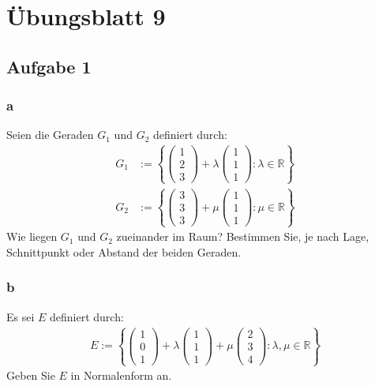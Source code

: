 \chapter{Übungsblatt 9}

\section{Aufgabe 1}

\subsection{a}
Seien die Geraden $G_1$ und $G_2$ definiert durch:
\begin{align*}
G_1 &:= \left\{\begin{pmatrix}
1 \\ 2 \\ 3
\end{pmatrix} + \lambda\begin{pmatrix}
1 \\ 1 \\ 1
\end{pmatrix}: \lambda \in \mathbb{R}\right\} \\
G_2 &:= \left\{\begin{pmatrix}
3 \\ 3 \\ 3
\end{pmatrix} + \mu \begin{pmatrix}
1 \\ 1 \\ 1
\end{pmatrix}: \mu \in \mathbb{R}\right\}
\end{align*}
Wie liegen $G_1$ und $G_2$ zueinander im Raum? Bestimmen Sie, je nach Lage, Schnittpunkt oder Abstand der beiden Geraden.

\subsection{b}

Es sei $E$ definiert durch:
\begin{align*}
    E := \left\{\begin{pmatrix}
    1 \\ 0 \\1
    \end{pmatrix} + \lambda \begin{pmatrix}
        1 \\ 1 \\ 1
    \end{pmatrix} + \mu \begin{pmatrix}
        2 \\ 3 \\ 4
    \end{pmatrix}: \lambda, \mu \in \mathbb{R}\right\}
\end{align*}
Geben Sie $E$ in Normalenform an.

